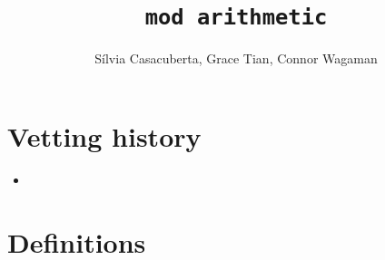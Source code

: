 \documentclass{article}
\title{\texttt{mod arithmetic}}
\author{S\'ilvia Casacuberta, Grace Tian, Connor Wagaman}
\date{}
\begin{document}
\maketitle

\contrib

\section{Vetting history}
\begin{itemize}
    \item {}
\end{itemize}

\section{Definitions}
\end{document}
